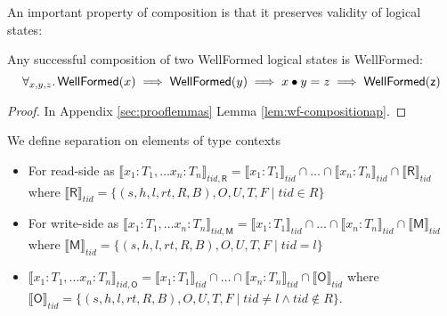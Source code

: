 An important property of composition is that it preserves validity of logical states:
\begin{lemma}
\label{lem:wf-composition}
Any successful composition of two \textsf{WellFormed} logical states is \textsf{WellFormed}:\[\forall_{x,y,z}\ldotp \mathsf{WellFormed}(x) \implies \mathsf{WellFormed}(y) \implies x\bullet y = z \implies \mathsf{WellFormed(z)}\]
\end{lemma}
\begin{proof}
In Appendix \ref{sec:prooflemmas} Lemma \ref{lem:wf-compositionap}.
  \end{proof}
We define separation on elements of type contexts
\begin{itemize}
\item For read-side as $\llbracket x_1 : T_1, \ldots x_n : T_n \rrbracket_{tid,\textsf{R}} = \llbracket x_1 : T_1 \rrbracket_{tid} \cap \ldots \cap \llbracket x_n : T_n \rrbracket_{tid} \cap \llbracket \textsf{R} \rrbracket_{tid}$ where
$\llbracket \textsf{R} \rrbracket_{tid} = \{ (s,h,l,rt,R,B),O,U,T,F  \mid tid \in R \}$

\item For write-side as $\llbracket x_1 : T_1, \ldots x_n : T_n \rrbracket_{tid,\textsf{M}} = \llbracket x_1 : T_1 \rrbracket_{tid} \cap \ldots \cap \llbracket x_n : T_n \rrbracket_{tid} \cap \llbracket \textsf{M} \rrbracket_{tid}$ where
$\llbracket \textsf{M} \rrbracket_{tid} = \{ (s,h,l,rt,R,B),O,U,T,F  \mid tid = l \}$

\item $\llbracket x_1 : T_1, \ldots x_n : T_n \rrbracket_{tid,\textsf{O}} = \llbracket x_1 : T_1 \rrbracket_{tid} \cap \ldots \cap \llbracket x_n : T_n \rrbracket_{tid} \cap \llbracket \textsf{O} \rrbracket_{tid}$ where
$\llbracket \textsf{O} \rrbracket_{tid} = \{ (s,h,l,rt,R,B),O,U,T,F  \mid tid \neq l \land tid \notin R \}$.
\end{itemize}

